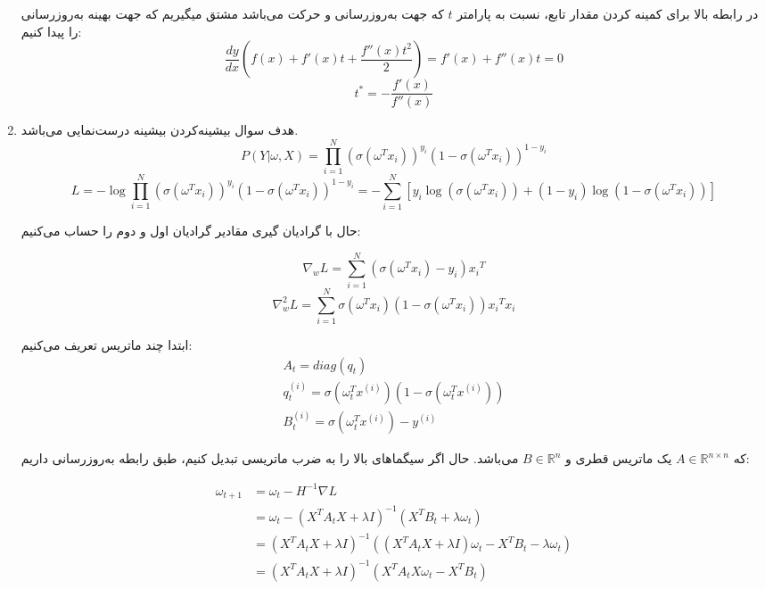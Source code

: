 \documentclass{article}
\begin{document}
\begin{enumerate}
	در رابطه بالا برای کمینه کردن مقدار تابع، نسبت به پارامتر $t$ که جهت به‌روزرسانی و حرکت می‌باشد مشتق میگیریم که جهت بهینه به‌روزرسانی را پیدا کنیم:
	$$
	\frac{{dy}}{{dx}}\left( {f\left( x \right) + f'\left( x \right)t + \frac{{f''\left( x \right){t^2}}}{2}} \right) = f'\left( x \right) + f''\left( x \right)t = 0
	$$
	$$
	{t^*} =  - \frac{{f'\left( x \right)}}{{f''\left( x \right)}}
	$$
	
	\item
	
	هدف سوال بیشینه‌کردن بیشینه درست‌نمایی می‌باشد.
	$$
	P\left( {Y|\omega ,X} \right) = \prod\limits_{i = 1}^N {{{\left( {\sigma \left( {{\omega ^T}{x_i}} \right)} \right)}^{{y_i}}}{{\left( {1 - \sigma \left( {{\omega ^T}{x_i}} \right)} \right)}^{1 - {y_i}}}}
	$$
	$$
	L =  - \log \prod\limits_{i = 1}^N {{{\left( {\sigma \left( {{\omega ^T}{x_i}} \right)} \right)}^{{y_i}}}{{\left( {1 - \sigma \left( {{\omega ^T}{x_i}} \right)} \right)}^{1 - {y_i}}}}  =  - \sum\limits_{i = 1}^N {\left[ {{y_i}\log \left( {\sigma \left( {{\omega ^T}{x_i}} \right)} \right) + \left( {1 - {y_i}} \right)\log \left( {1 - \sigma \left( {{\omega ^T}{x_i}} \right)} \right)} \right]}
	$$
	
	حال با گرادیان گیری مقادیر گرادیان اول و دوم را حساب می‌کنیم:
	
	$$
	\nabla_w L = \sum\limits_{i = 1}^N {\left( {\sigma \left( {{\omega ^T}{x_i}} \right) - {y_i}} \right){x_i}^T}
	$$
	$$
	\nabla_w^2 L = \sum\limits_{i = 1}^N {\sigma \left( {{\omega ^T}{x_i}} \right)\left( {1 - \sigma \left( {{\omega ^T}{x_i}} \right)} \right){x_i}^T{x_i}}
	$$
	
	ابتدا چند ماتریس تعریف می‌کنیم:
	$$
	\begin{array}{l}
		{A_t} = diag({q_t})\\
		q_t^{\left( i \right)} = \sigma \left( {\omega _t^T{x^{\left( i \right)}}} \right)\left( {1 - \sigma \left( {\omega _t^T{x^{\left( i \right)}}} \right)} \right)\\
		B_t^{\left( i \right)} = \sigma \left( {\omega _t^T{x^{\left( i \right)}}} \right) - {y^{\left( i \right)}}
	\end{array}
	$$
	
	که
	$A \in {\mathbb{R}^{n \times n}}$
	یک ماتریس قطری
	و
	$B \in {\mathbb{R}^n}$
	می‌باشد. 
	حال اگر سیگماهای بالا را به ضرب ماتریسی تبدیل کنیم،‌ طبق رابطه به‌روزرسانی داریم:
	
	$$
	\begin{aligned}
		{\omega _{t + 1}} & = {\omega _t} - {H^{ - 1}}\nabla L\\
		& = {\omega _t} - {\left( {{X^T}{A_t}X + \lambda I} \right)^{ - 1}}\left( {{X^T}{B_t} + \lambda {\omega _t}} \right)\\
		&‌= {\left( {{X^T}{A_t}X + \lambda I} \right)^{ - 1}}\left( {\left( {{X^T}{A_t}X + \lambda I} \right){\omega _t} - {X^T}{B_t} - \lambda {\omega _t}} \right)\\
		&‌= {\left( {{X^T}{A_t}X + \lambda I} \right)^{ - 1}}\left( {{X^T}{A_t}X{\omega _t} - {X^T}{B_t}} \right)
	\end{aligned}
	$$
	
	
\end{enumerate}
\end{document}
